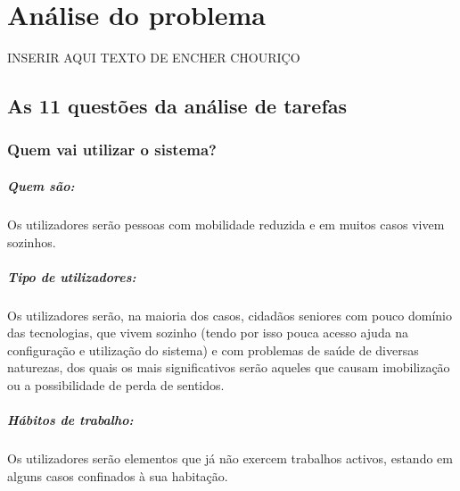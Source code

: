 \chapter{Análise do problema}
\label{cap2}


INSERIR AQUI TEXTO DE ENCHER CHOURIÇO

\section{As 11 questões da análise de tarefas}

\subsection{Quem vai utilizar o sistema?}
\paragraph{Quem são:}Os utilizadores serão pessoas com mobilidade reduzida e em muitos casos vivem sozinhos.

\paragraph{Tipo de utilizadores:} Os utilizadores serão, na maioria dos casos, cidadãos seniores com pouco domínio das tecnologias, que vivem sozinho (tendo por isso pouca acesso ajuda na configuração e utilização do sistema) e com problemas de saúde de diversas naturezas, dos quais os mais significativos serão aqueles que causam imobilização ou a possibilidade de perda de sentidos.

\paragraph{Hábitos de trabalho:} Os utilizadores serão elementos que já não exercem trabalhos activos, estando em alguns casos confinados à sua habitação.

